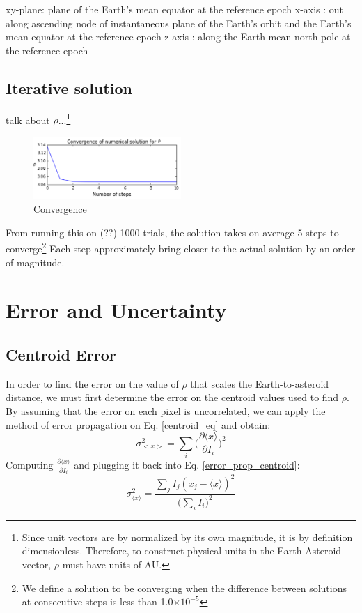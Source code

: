 \documentclass[authoryear, 12pt,5p, times]{elsarticle}
\begin{document}
	 xy-plane: plane of the Earth's mean equator at the reference epoch
    x-axis  : out along ascending node of instantaneous plane of the Earth's
              orbit and the Earth's mean equator at the reference epoch
    z-axis  : along the Earth mean north pole at the reference epoch
    \subsection{Iterative solution}
    talk about $\rho$...\footnote{Since unit vectors are by normalized by its own magnitude, it is by definition dimensionless. Therefore, to construct physical units in the Earth-Asteroid vector, $\rho$ must have units of AU.}
    \label{iterative_soln}
    	\begin{figure}[h!]
\includegraphics[width=0.5\textwidth]{figures/convergence_example}
\caption{ Convergence}
\label{convergence_example}
\end{figure}
    From running this on (??) 1000 trials, the solution takes on average 5 steps to converge\footnote{ We define a solution to be converging when the difference between solutions at consecutive steps is less than 1.0$\times10^{-5}$} Each step approximately  bring  closer to the actual solution by an order of magnitude. 
\section{Error and Uncertainty}
\subsection{Centroid Error}
\label{centroid_error}
In order to find the error on the value of $\rho$ that scales the Earth-to-asteroid distance, we must first determine the error on the centroid values used to find $\rho$. 
By assuming that the error on each pixel is uncorrelated, we can apply the method of error propagation on Eq. \ref{centroid_eq} and obtain:
\begin{equation}
\sigma^2_{<x>}=\sum_{i} \Bigg(\frac{\partial \langle x\rangle}{\partial I_i}\Bigg)^2
\label{error_prop_centroid}
\end{equation} 
Computing $\frac{\partial \langle x\rangle}{\partial I_i}$ and plugging it back into Eq. \ref{error_prop_centroid}: 
\begin{equation}
\sigma^2_{\langle x\rangle}=\frac{\sum\limits_{j}I_j (x_j-\langle x\rangle)^2 }{\Big(\sum \limits_{i} I_i\Big)^2}
\end{equation}
\end{document}
